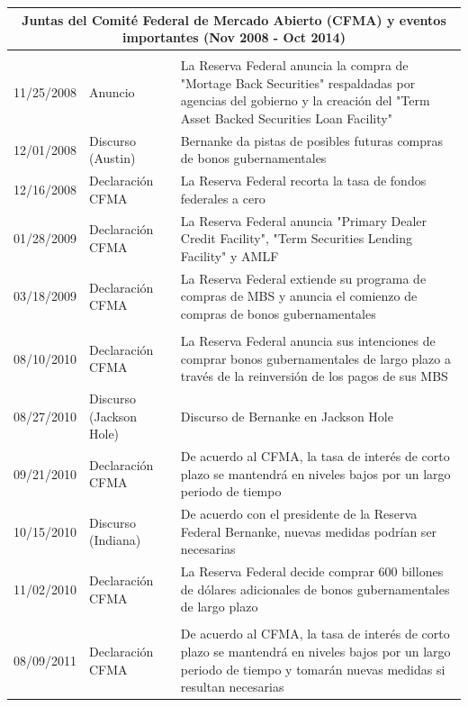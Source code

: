 \documentclass[
  9.5pt,
]{article}
\begin{document}
\begin{table}[H]
  \begin{center}
  \resizebox{18cm}{18cm} {
    \begin{tabular}{| m{3cm} | m{5cm} | m{15cm} |}
      \hline
\multicolumn{3}{|c|}{Juntas del Comité Federal de Mercado Abierto (CFMA) y eventos importantes (Nov 2008 - Oct 2014)} \\ \hline
\rowcolor{Gray}\multicolumn{3}{|c|}{"First Large Scale Asset Purchase" (LSAP)} \\ \hline
11/25/2008   & Anuncio &    La Reserva Federal anuncia la compra de "Mortage Back Securities" respaldadas por agencias del gobierno y la creación del "Term Asset Backed Securities Loan Facility" \\
12/01/2008  & Discurso (Austin) & Bernanke da pistas de posibles futuras compras de bonos gubernamentales \\
12/16/2008  & Declaración CFMA  & La Reserva Federal recorta la tasa de fondos federales a cero \\
01/28/2009  & Declaración CFMA  & La Reserva Federal anuncia "Primary Dealer Credit Facility", "Term Securities Lending Facility" y AMLF \\
03/18/2009  & Declaración CFMA &    La Reserva Federal extiende su programa de compras de MBS y anuncia el comienzo de compras de bonos gubernamentales \\
\rowcolor{Gray}\multicolumn{3}{|c|}{"Second LSAP"} \\ \hline
08/10/2010  & Declaración CFMA &    La Reserva Federal anuncia sus intenciones de comprar bonos gubernamentales de largo plazo a través de la reinversión de los pagos de sus MBS \\
08/27/2010  & Discurso (Jackson Hole) & Discurso de Bernanke en Jackson Hole \\
09/21/2010  & Declaración CFMA  & De acuerdo al CFMA, la tasa de interés de corto plazo se mantendrá en niveles bajos por un largo periodo de tiempo \\
10/15/2010  & Discurso (Indiana) &  De acuerdo con el presidente de la Reserva Federal Bernanke, nuevas medidas podrían ser necesarias \\
11/02/2010  & Declaración CFMA &    La Reserva Federal decide comprar 600 billones de dólares adicionales  de bonos gubernamentales de largo plazo \\
\rowcolor{Gray}\multicolumn{3}{|c|}{"Maturity Extension Program" (MEP)} \\ \hline
08/09/2011  & Declaración CFMA &    De acuerdo al CFMA, la tasa de interés de corto plazo se mantendrá en niveles bajos por un largo periodo de tiempo y tomarán nuevas medidas si resultan necesarias \\

\end{tabular}}
\end{center}
\end{table}
\end{document}
